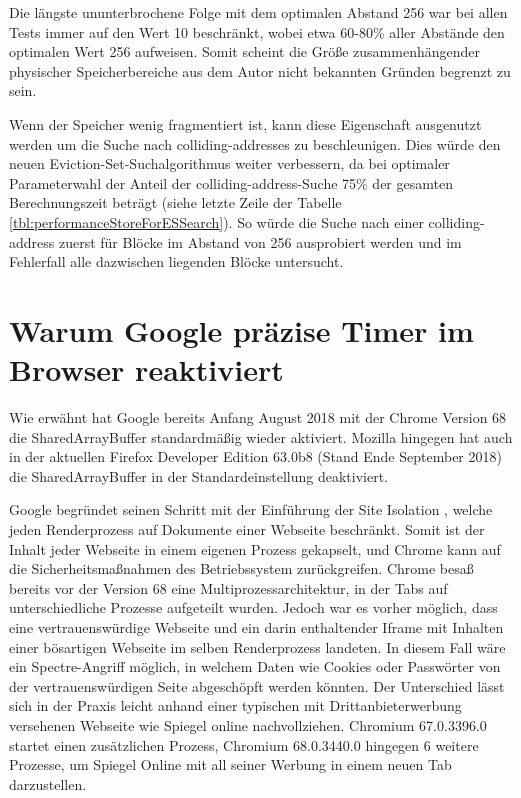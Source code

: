 Die längste ununterbrochene Folge mit dem optimalen Abstand 256 war bei allen Tests immer auf den Wert 10 beschränkt, wobei etwa 60-80\% aller Abstände den optimalen Wert 256 aufweisen.
Somit scheint die Größe zusammenhängender physischer Speicherbereiche aus dem Autor nicht bekannten Gründen begrenzt zu sein.

Wenn der Speicher wenig fragmentiert ist, kann diese Eigenschaft ausgenutzt werden um die Suche nach colliding-addresses zu beschleunigen.
Dies würde den neuen Eviction-Set-Suchalgorithmus weiter verbessern, da bei optimaler Parameterwahl der Anteil der colliding-address-Suche 75\% der gesamten Berechnungszeit beträgt (siehe letzte Zeile der Tabelle \ref{tbl:performanceStoreForESSearch}).
So würde die Suche nach einer colliding-address zuerst für Blöcke im Abstand von 256 ausprobiert werden und im Fehlerfall alle dazwischen liegenden Blöcke untersucht.



\section{Warum Google präzise Timer im Browser reaktiviert}
\label{GooglePageIsolation}

Wie erwähnt hat Google bereits Anfang August 2018 mit der Chrome Version 68 \cite{ChromeSharedArrayBufferAgain} die SharedArrayBuffer standardmäßig wieder aktiviert.
Mozilla hingegen hat auch in der aktuellen Firefox Developer Edition 63.0b8 (Stand Ende September 2018) die SharedArrayBuffer in der Standardeinstellung deaktiviert.

Google begründet seinen Schritt mit der Einführung der Site Isolation \cite{ChromeSiteIsolation}, welche jeden Renderprozess auf Dokumente einer Webseite beschränkt. Somit ist der Inhalt jeder Webseite in einem eigenen Prozess gekapselt, und Chrome kann auf die Sicherheitsmaßnahmen des Betriebssystem zurückgreifen.
Chrome besaß bereits vor der Version 68 eine Multiprozessarchitektur, in der Tabs auf unterschiedliche Prozesse aufgeteilt wurden.
Jedoch war es vorher möglich, dass eine vertrauenswürdige Webseite und ein darin enthaltender Iframe mit Inhalten einer bösartigen Webseite im selben Renderprozess landeten.
In diesem Fall wäre ein Spectre-Angriff möglich, in welchem Daten wie Cookies oder Passwörter von der vertrauenswürdigen Seite abgeschöpft werden könnten.
Der Unterschied lässt sich in der Praxis leicht anhand einer typischen mit Drittanbieterwerbung versehenen Webseite wie Spiegel online nachvollziehen.
Chromium 67.0.3396.0 startet einen zusätzlichen Prozess, Chromium 68.0.3440.0 hingegen 6 weitere Prozesse, um Spiegel Online mit all seiner Werbung in einem neuen Tab darzustellen.

